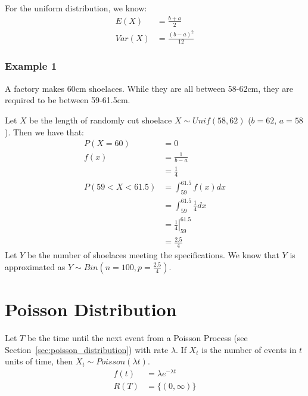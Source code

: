                 For the uniform distribution, we know:
                \begin{align*}
                    E(X) &= \frac{b + a}{2} \\
                    Var(X) &= \frac{(b - a)^2}{12}
                \end{align*}
                \subsubsection{Example 1} %
                \label{ssub:example_1}
                    A factory makes 60cm shoelaces.
                    While they are all between 58-62cm, they are required to be between 59-61.5cm.

                    Let $X$ be the length of randomly cut shoelace $X \sim Unif(58, 62)$ ($b = 62$, $a = 58$).
                    Then we have that:
                    \begin{align*}
                        P(X = 60) &= 0 \\
                        f(x) &= \frac{1}{b-a} \\
                        &= \frac{1}{4} \\
                        P(59 < X < 61.5) &= \int_{59}^{61.5} f(x)dx \\
                        &= \int_{59}^{61.5} \frac{1}{4}dx \\
                        &= \left. \frac{1}{4} \right|_{59}^{61.5} \\
                        &= \frac{2.5}{4}
                    \end{align*}
                    Let $Y$ be the number of shoelaces meeting the specifications.
                    We know that $Y$ is approximated as $Y \sim Bin(n = 100, p = \frac{2.5}{4})$.
            \section{Poisson Distribution} %
            \label{sec:continuous_poisson_distribution}
                Let $T$ be the time until the next event from a Poisson Process (see Section~\ref{sec:poisson_distribution}) with rate $\lambda$.
                If $X_t$ is the number of events in $t$ units of time, then $X_t \sim Poisson(\lambda t)$.
                \begin{align*}
                    f(t) &= \lambda e^{-\lambda t} \\
                    R(T) &= \{ (0, \infty) \}
                \end{align*}
